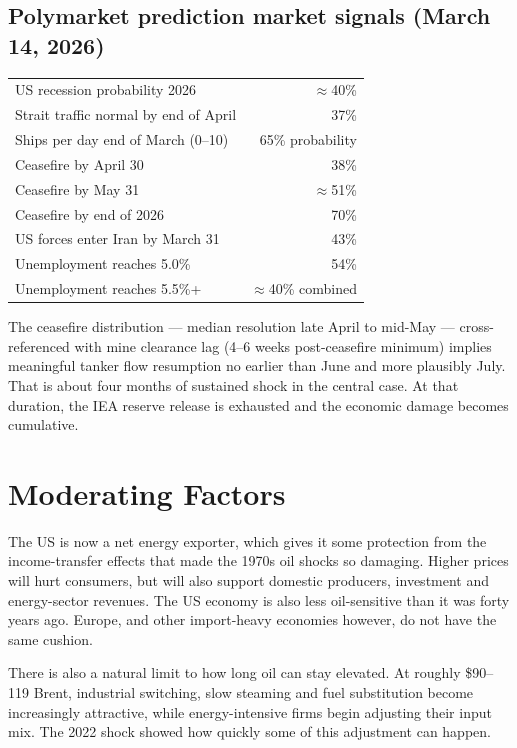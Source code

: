 \documentclass[12pt,a4paper]{article}
\begin{document}
\subsection{Polymarket prediction market signals (March 14, 2026)}

\begin{summarybox}
\begin{tabular}{p{8cm}r}
  US recession probability 2026 & $\approx$40\% \\
  Strait traffic normal by end of April & 37\% \\
  Ships per day end of March (0--10) & 65\% probability \\
  Ceasefire by April 30 & 38\% \\
  Ceasefire by May 31 & $\approx$51\% \\
  Ceasefire by end of 2026 & 70\% \\
  US forces enter Iran by March 31 & 43\% \\
  Unemployment reaches 5.0\% & 54\% \\
  Unemployment reaches 5.5\%+ & $\approx$40\% combined \\
\end{tabular}
\end{summarybox}

The ceasefire distribution --- median resolution late April to mid-May --- cross-referenced with mine clearance lag (4--6 weeks post-ceasefire minimum) implies meaningful tanker flow resumption no earlier than June and more plausibly July. That is about four months of sustained shock in the central case. At that duration, the IEA reserve release is exhausted and the economic damage becomes cumulative.

\section{Moderating Factors}

The US is now a net energy exporter, which gives it some protection from the income-transfer effects that made the 1970s oil shocks so damaging. Higher prices will hurt consumers, but  will also support domestic producers, investment and energy-sector revenues. The US economy is also less oil-sensitive than it was forty years ago. Europe, and other import-heavy economies however, do not have the same cushion.

There is also a natural limit to how long oil can stay elevated. At roughly \$90–119 Brent, industrial switching, slow steaming and fuel substitution become increasingly attractive, while energy-intensive firms begin adjusting their input mix. The 2022 shock showed how quickly some of this adjustment can happen.
\end{document}
